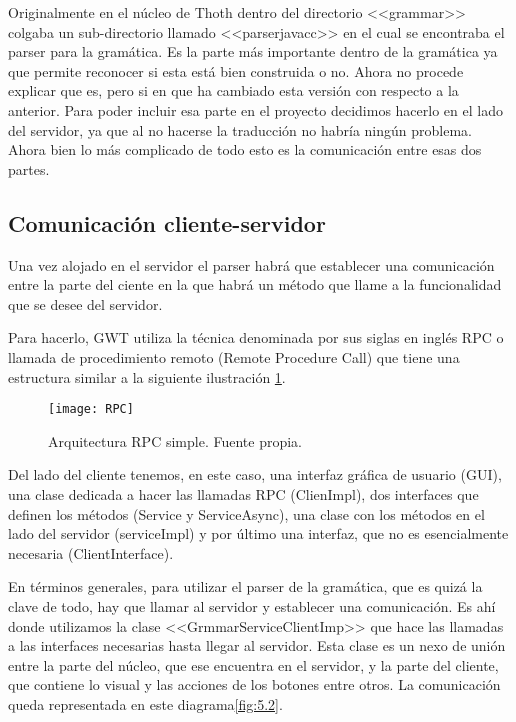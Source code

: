 Originalmente en el núcleo de Thoth dentro del directorio <<grammar>> colgaba un sub-directorio llamado <<parserjavacc>> en el cual se encontraba el parser para la gramática. Es la parte más importante dentro de la gramática ya que permite reconocer si esta está bien construida o no.
Ahora no procede explicar que es, pero si en que ha cambiado esta versión con respecto a la anterior. 
Para poder incluir esa parte en el proyecto decidimos hacerlo en el lado del servidor, ya que al no hacerse la traducción no habría ningún problema. Ahora bien lo más complicado de todo esto es la comunicación entre esas dos partes.



\subsection{Comunicación cliente-servidor}
Una vez alojado en el servidor el parser habrá que establecer una comunicación entre la parte del ciente en la que habrá un método que llame a la funcionalidad que se desee del servidor.

Para hacerlo, GWT utiliza la técnica denominada por sus siglas en inglés RPC o llamada de procedimiento remoto (Remote Procedure Call) que tiene una estructura similar a la siguiente ilustración \ref{fig:5.1}.

\begin{figure}[h]
\centering
\texttt{[image: RPC]}
\caption{Arquitectura RPC simple. Fuente propia.}
\label{fig:5.1}
\end{figure}

Del lado del cliente tenemos, en este caso, una interfaz gráfica de usuario (GUI), una clase dedicada a hacer las llamadas RPC (ClienImpl), dos interfaces que definen los métodos (Service y ServiceAsync), una clase con los métodos en el lado del servidor (serviceImpl) y por último una interfaz, que no es esencialmente necesaria (ClientInterface). 

En términos generales, para utilizar el parser de la gramática, que es quizá la clave de todo, hay que llamar al servidor y establecer una comunicación. Es ahí donde utilizamos la clase <<GrmmarServiceClientImp>> que hace las llamadas a las interfaces necesarias hasta llegar al servidor. Esta clase es un nexo de unión entre la parte del núcleo, que ese encuentra en el servidor, y la parte del cliente, que contiene lo visual y las acciones de los botones entre otros. La comunicación queda representada en este diagrama\ref{fig:5.2}.


